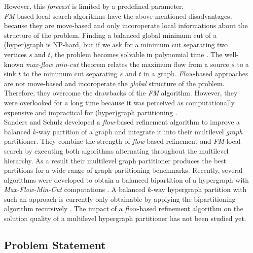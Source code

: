 However, this \emph{forecast} is limited by a predefined parameter. \\
\emph{FM}-based local search algorithms have the above-mentioned disadvantages, because
they are move-based and only incoroperate local informations about the structure of the problem.
Finding a balanced global minimum cut of a (hyper)graph is NP-hard, but if we ask for a minimum
cut separating two vertices $s$ and $t$, the problem becomes solvable in polynomial time \cite{edmonds1972theoretical}.
The well-known \emph{max-flow min-cut} theorem \cite{ford1956maximal} relates the
maximum flow from a source $s$ to a sink $t$ to the minimum cut separating
$s$ and $t$ in a graph. \emph{Flow}-based approaches are not move-based and
incoroperate the \emph{global} structure of the problem.
Therefore, they overcome the drawbacks of the \emph{FM} algorithm. However, they were overlooked for a long time because
it was perceived as computationally expensive and impractical for (hyper)graph partitioning
\cite{liu1998network}. \\ 
Sanders and Schulz \cite{sanders2011engineering} developed a \emph{flow}-based
refinement algorithm to improve a balanced $k$-way partition of a graph and integrate it
into their multilevel \emph{graph} partitioner. 
They combine the strength of \emph{flow}-based refinement and \emph{FM}
local search by executing both algorithms alternating throughout the multilevel hierarchy.
As a result their multilevel graph partitioner produces the best partitions for 
a wide range of graph partitioning benchmarks. 
Recently, several algorithms were developed to obtain a balanced bipartition of a hypergraph 
with \emph{Max-Flow-Min-Cut} computations \cite{liu1998network,patkar2004efficient,yang1996balanced}. 
A balanced $k$-way hypergraph partition with such an approach is currently only
obtainable by applying the bipartitioning algorithm recursively \cite{yang1996balanced}. 
The impact of a \emph{flow}-based refinement algorithm on the solution quality of 
a multilevel hypergraph partitioner has not been studied yet. 

\subsection{Problem Statement}

